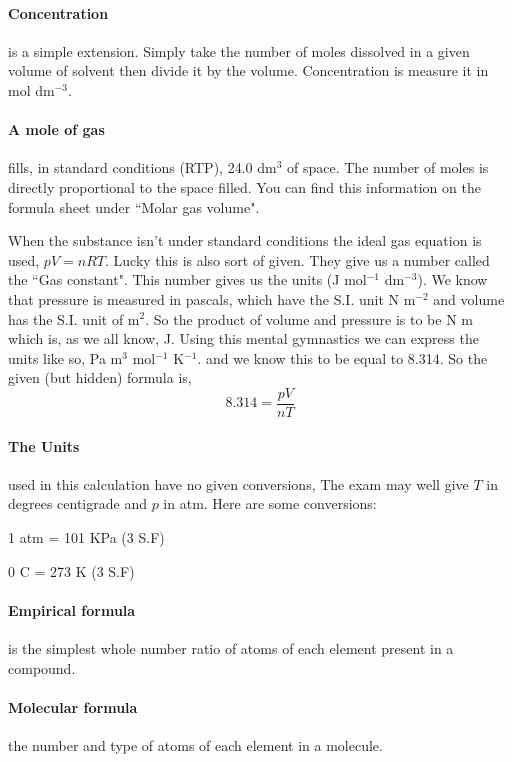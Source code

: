 \documentclass[11pt,a4paper]{memoir}
\begin{document}
	\paragraph{Concentration} is a simple extension. Simply take the number of moles dissolved in a given volume of solvent then divide it by the volume. Concentration is measure it in mol dm$^{-3}$.
     
	\paragraph{A mole of gas} fills, in standard conditions (RTP), 24.0 dm$^3$ of space. The number of moles is directly proportional to the space filled. You can find this information on the formula sheet under ``Molar gas volume".
     
	When the substance isn't under standard conditions the ideal gas equation is used, $pV = nRT$. Lucky this is also sort of given. They give us a number called the ``Gas constant". This number gives us the units (J mol$^{-1}$ dm$^{-3}$). We know that pressure is measured in pascals, which have the S.I. unit N m$^{-2}$ and volume has the S.I. unit of m$^2$. So the product of volume and pressure is to be N m which is, as we all know, J. Using this mental gymnastics we can express the units like so, Pa m$^3$ mol$^{-1}$ K$^{-1}$. and we know this to be equal to 8.314. So the given (but hidden) formula is,
	\begin{equation}
		8.314 = \frac{pV}{nT}
	\end{equation}
	
	\paragraph{The Units} used in this calculation have no given conversions, The exam may well give $T$ in degrees centigrade and $p$ in atm. Here are some conversions:
    
	1 atm = 101 KPa (3 S.F)
	
	0  C = 273 K (3 S.F)
	
	\paragraph{Empirical formula} is the simplest whole number ratio of atoms of each element present in a compound.
	
	\paragraph{Molecular formula} the number and type of atoms of each element in a molecule.
    
\end{document}
